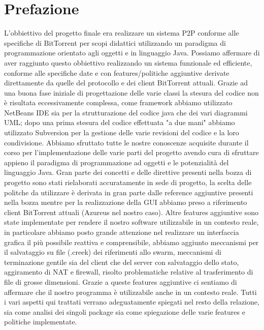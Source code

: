 \section{Prefazione}

L'obbiettivo del progetto finale era realizzare un sistema P2P conforme alle specifiche di BitTorrent per scopi didattici utilizzando un paradigma di programmazione orientato agli oggetti e in linguaggio Java.
Possiamo affermare di aver raggiunto questo obbiettivo realizzando un sistema funzionale ed efficiente, conforme alle specifiche date e con features/politiche aggiuntive derivate direttamente da quelle del protocollo e dei client BitTorrent attuali.
Grazie ad una buona fase iniziale di progettazione delle varie classi la stesura del codice non \`e risultata eccessivamente complessa, come framework abbiamo utilizzato NetBeans IDE sia per la strutturazione del codice java che dei vari diagrammi UML; dopo una prima stesura del codice effettuata "a due mani" abbiamo utilizzato Subversion per la gestione delle varie revisioni del codice e la loro condivisione. Abbiamo sfruttato tutte le nostre conoscenze acquisite durante il corso per l'implementazione delle varie parti del progetto avendo cura di sfruttare appieno il paradigma di programmazione ad oggetti e le potenzialit\`a del linguaggio Java.
Gran parte dei concetti e delle direttive presenti nella bozza di progetto sono stati rielaborati accuratamente in sede di progetto, la scelta delle politche da utilizzare \`e derivata in gran parte dalle reference aggiuntive presenti nella bozza mentre per la realizzazione della GUI abbiamo preso a riferimento client BitTorrent attuali (Azureus nel nostro caso). Altre features aggiuntive sono state implementate per rendere il nostro software utilizzabile in un contesto reale, in particolare abbiamo posto grande attenzione nel realizzare un interfaccia grafica il pi\`u possibile reattiva e comprensibile, abbiamo aggiunto meccanismi per il salvataggio su file (.creek) dei riferimenti allo swarm, meccanismi di terminazione gentile sia del client che del server con salvataggio dello stato, aggiramento di NAT e firewall, risolto problematiche relative al trasferimento di file di grosse dimensioni.
Grazie a queste features aggiuntive ci sentiamo di affermare che il nostro programma \`e utilizzabile anche in un contesto reale.
Tutti i vari aspetti qui trattati verrano adeguatamente spiegati nel resto della relazione, sia come analisi dei singoli package sia come spiegazione delle varie features e politiche implementate.